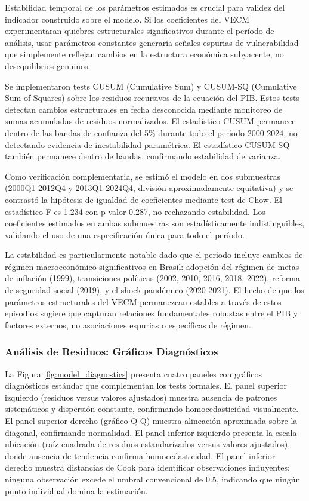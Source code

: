\documentclass[3p,11pt,draft,natbib=false]{elsarticle}
\begin{document}
Estabilidad temporal de los parámetros estimados es crucial para validez del indicador construido sobre el modelo. Si los coeficientes del VECM experimentaran quiebres estructurales significativos durante el período de análisis, usar parámetros constantes generaría señales espurias de vulnerabilidad que simplemente reflejan cambios en la estructura económica subyacente, no desequilibrios genuinos.

Se implementaron tests CUSUM (Cumulative Sum) y CUSUM-SQ (Cumulative Sum of Squares) sobre los residuos recursivos de la ecuación del PIB. Estos tests detectan cambios estructurales en fecha desconocida mediante monitoreo de sumas acumuladas de residuos normalizados. El estadístico CUSUM permanece dentro de las bandas de confianza del 5\% durante todo el período 2000-2024, no detectando evidencia de inestabilidad paramétrica. El estadístico CUSUM-SQ también permanece dentro de bandas, confirmando estabilidad de varianza.

Como verificación complementaria, se estimó el modelo en dos submuestras (2000Q1-2012Q4 y 2013Q1-2024Q4, división aproximadamente equitativa) y se contrastó la hipótesis de igualdad de coeficientes mediante test de Chow. El estadístico F es 1.234 con p-valor 0.287, no rechazando estabilidad. Los coeficientes estimados en ambas submuestras son estadísticamente indistinguibles, validando el uso de una especificación única para todo el período.

La estabilidad es particularmente notable dado que el período incluye cambios de régimen macroeconómico significativos en Brasil: adopción del régimen de metas de inflación (1999), transiciones políticas (2002, 2010, 2016, 2018, 2022), reforma de seguridad social (2019), y el shock pandémico (2020-2021). El hecho de que los parámetros estructurales del VECM permanezcan estables a través de estos episodios sugiere que capturan relaciones fundamentales robustas entre el PIB y factores externos, no asociaciones espurias o específicas de régimen.

\subsubsection{Análisis de Residuos: Gráficos Diagnósticos}

La Figura \ref{fig:model_diagnostics} presenta cuatro paneles con gráficos diagnósticos estándar que complementan los tests formales. El panel superior izquierdo (residuos versus valores ajustados) muestra ausencia de patrones sistemáticos y dispersión constante, confirmando homocedasticidad visualmente. El panel superior derecho (gráfico Q-Q) muestra alineación aproximada sobre la diagonal, confirmando normalidad. El panel inferior izquierdo presenta la escala-ubicación (raíz cuadrada de residuos estandarizados versus valores ajustados), donde ausencia de tendencia confirma homocedasticidad. El panel inferior derecho muestra distancias de Cook para identificar observaciones influyentes: ninguna observación excede el umbral convencional de 0.5, indicando que ningún punto individual domina la estimación.
\end{document}
